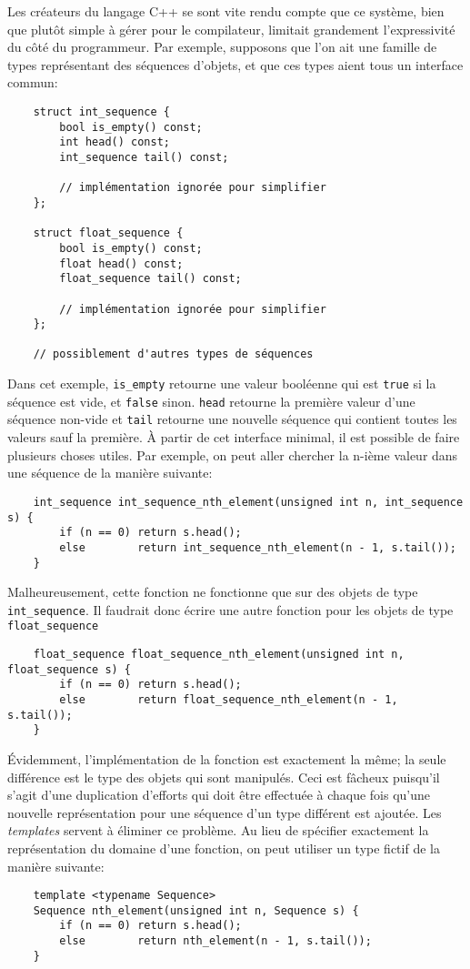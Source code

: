 Les créateurs du langage C++ se sont vite rendu compte que ce système,
bien que plutôt simple à gérer pour le compilateur, limitait grandement
l'expressivité du côté du programmeur. Par exemple, supposons que l'on
ait une famille de types représentant des séquences d'objets, et que ces
types aient tous un interface commun:

\begin{verbatim}
    struct int_sequence {
        bool is_empty() const;
        int head() const;
        int_sequence tail() const;

        // implémentation ignorée pour simplifier
    };

    struct float_sequence {
        bool is_empty() const;
        float head() const;
        float_sequence tail() const;

        // implémentation ignorée pour simplifier
    };

    // possiblement d'autres types de séquences
\end{verbatim}

Dans cet exemple, {\tt is\_empty} retourne une valeur booléenne qui est {\tt true}
si la séquence est vide, et {\tt false} sinon. {\tt head} retourne la première
valeur d'une séquence non-vide et {\tt tail} retourne une nouvelle séquence
qui contient toutes les valeurs sauf la première. À partir de cet interface
minimal, il est possible de faire plusieurs choses utiles. Par exemple, on
peut aller chercher la n-ième valeur dans une séquence de la manière suivante:
\begin{verbatim}
    int_sequence int_sequence_nth_element(unsigned int n, int_sequence s) {
        if (n == 0) return s.head();
        else        return int_sequence_nth_element(n - 1, s.tail());
    }
\end{verbatim}

Malheureusement, cette fonction ne fonctionne que sur des objets de type
{\tt int\_sequence}. Il faudrait donc écrire une autre fonction pour les
objets de type {\tt float\_sequence}
\begin{verbatim}
    float_sequence float_sequence_nth_element(unsigned int n, float_sequence s) {
        if (n == 0) return s.head();
        else        return float_sequence_nth_element(n - 1, s.tail());
    }
\end{verbatim}

Évidemment, l'implémentation de la fonction est exactement la même; la seule
différence est le type des objets qui sont manipulés. Ceci est fâcheux puisqu'il
s'agit d'une duplication d'efforts qui doit être effectuée à chaque fois qu'une
nouvelle représentation pour une séquence d'un type différent est ajoutée. Les
\textit{templates} servent à éliminer ce problème. Au lieu de spécifier exactement
la représentation du domaine d'une fonction, on peut utiliser un type fictif de la
manière suivante:
\begin{verbatim}
    template <typename Sequence>
    Sequence nth_element(unsigned int n, Sequence s) {
        if (n == 0) return s.head();
        else        return nth_element(n - 1, s.tail());
    }
\end{verbatim}

